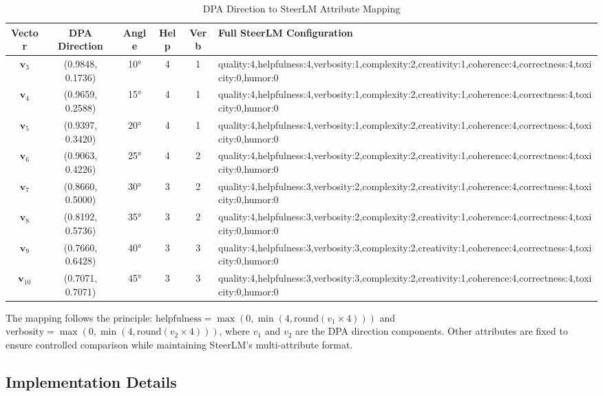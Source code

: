 \documentclass{article} %
\begin{document}
\begin{table}[t]
\centering
\caption{DPA Direction to SteerLM Attribute Mapping}
\label{tab:steerlm_mapping}
\begin{tabular}{c|c|c|c|c|l}
\toprule
\textbf{Vector} & \textbf{DPA Direction} & \textbf{Angle} & \textbf{Help} & \textbf{Verb} & \textbf{Full SteerLM Configuration} \\
\midrule
$\mathbf{v}_3$ & (0.9848, 0.1736) & 10° & 4 & 1 & quality:4,helpfulness:4,verbosity:1,complexity:2,creativity:1,coherence:4,correctness:4,toxicity:0,humor:0 \\
$\mathbf{v}_4$ & (0.9659, 0.2588) & 15° & 4 & 1 & quality:4,helpfulness:4,verbosity:1,complexity:2,creativity:1,coherence:4,correctness:4,toxicity:0,humor:0 \\
$\mathbf{v}_5$ & (0.9397, 0.3420) & 20° & 4 & 1 & quality:4,helpfulness:4,verbosity:1,complexity:2,creativity:1,coherence:4,correctness:4,toxicity:0,humor:0 \\
$\mathbf{v}_6$ & (0.9063, 0.4226) & 25° & 4 & 2 & quality:4,helpfulness:4,verbosity:2,complexity:2,creativity:1,coherence:4,correctness:4,toxicity:0,humor:0 \\
$\mathbf{v}_7$ & (0.8660, 0.5000) & 30° & 3 & 2 & quality:4,helpfulness:3,verbosity:2,complexity:2,creativity:1,coherence:4,correctness:4,toxicity:0,humor:0 \\
$\mathbf{v}_8$ & (0.8192, 0.5736) & 35° & 3 & 2 & quality:4,helpfulness:3,verbosity:2,complexity:2,creativity:1,coherence:4,correctness:4,toxicity:0,humor:0 \\
$\mathbf{v}_9$ & (0.7660, 0.6428) & 40° & 3 & 3 & quality:4,helpfulness:3,verbosity:3,complexity:2,creativity:1,coherence:4,correctness:4,toxicity:0,humor:0 \\
$\mathbf{v}_{10}$ & (0.7071, 0.7071) & 45° & 3 & 3 & quality:4,helpfulness:3,verbosity:3,complexity:2,creativity:1,coherence:4,correctness:4,toxicity:0,humor:0 \\
\bottomrule
\end{tabular}
\end{table}

The mapping follows the principle: $\text{helpfulness} = \max(0, \min(4, \text{round}(v_1 \times 4)))$ and $\text{verbosity} = \max(0, \min(4, \text{round}(v_2 \times 4)))$, where $v_1$ and $v_2$ are the DPA direction components. Other attributes are fixed to ensure controlled comparison while maintaining SteerLM's multi-attribute format.

\subsection{Implementation Details}
\end{document}
